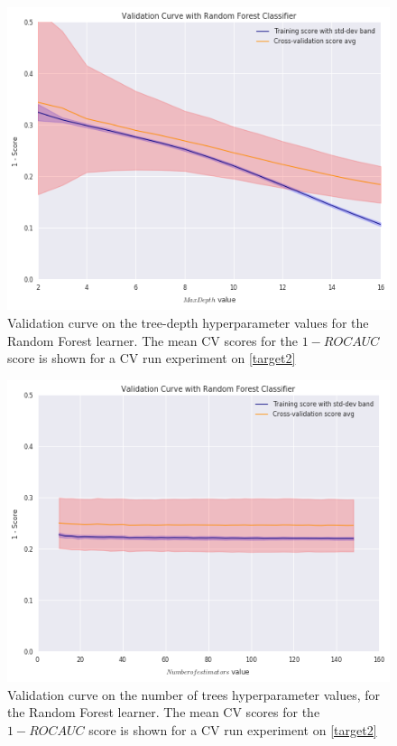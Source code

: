 \begin{figure}[h!]
	\begin{center}
	 \includegraphics[width=1\linewidth]{figures/random-forest/validation_curve_forest_depth_series_f1}
		\caption{ Validation curve on the tree-depth hyperparameter values for the Random Forest  learner.
			The mean CV scores for the $1 - ROC AUC$ score is shown for a CV run experiment on \cref{target2}}
		\label{fig:random_forest_validation_curves_depth_trees}

	\end{center}
\end{figure}

\begin{figure}[h!]
	\begin{center}
		\includegraphics[width=1\linewidth]{figures/random-forest/validation_curve_forest_num_trees_series_f1}
			\caption{ Validation curve on the number of trees hyperparameter values, for the Random Forest  learner.
				The mean CV scores for the $1 - ROC AUC$ score is shown for a CV run experiment on \cref{target2}}
		\label{fig:random_forest_validation_curves_num_trees}
	\end{center}
\end{figure}

